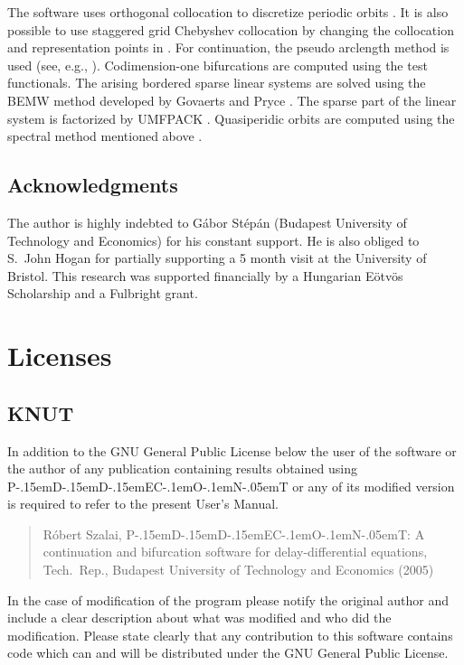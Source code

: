 \documentclass[10pt,a4paper]{ddedoc}
\def\knut{{P\kern-.15emD\kern-.15emD\kern-.15emE\raisebox{.25ex}{-}C\kern-.1emO\kern-.1emN\kern-.05emT}}
\begin{document}
The software uses orthogonal collocation to discretize periodic orbits
\cite{engstab,engcol}. It is also possible to use staggered grid Chebyshev
collocation \cite{kopriva} by changing the collocation and representation points
in . For continuation, the pseudo arclength method is
used (see, e.g., \cite{handbook, tutorial1, tutorial2}). Codimension-one
bifurcations are computed using the test functionals. The arising bordered
sparse linear systems are solved using the BEMW method developed by Govaerts and
Pryce \cite{Gov1993}. The sparse part of the linear system is factorized by
UMFPACK \cite{umfpack}. Quasiperidic orbits are computed using the spectral
method mentioned above \cite{kopriva,roose-szalai}.

\subsection*{Acknowledgments}

The author is highly indebted to G\'abor St\'ep\'an (Budapest University of 
Technology and Economics) for his constant support. He is also
obliged to S.~John Hogan for partially supporting a 5 month visit at the
University of Bristol.
This research was supported financially by a Hungarian E\"otv\"os Scholarship
and a Fulbright grant.

\appendix

\section{Licenses}

\subsection{KNUT}

In addition to the GNU General Public License below the user of the software or
the author of any
publication containing results obtained using \knut{} or any of its modified
version is required to refer to the present User's Manual.
\begin{quote}
R\'obert Szalai, \knut{}: A continuation and bifurcation software for 
delay-differential equations, Tech.\ Rep., Budapest University of Technology
and Economics (2005)
\end{quote}
In the case of modification of the program please notify the original author and
include a clear description about what was modified and who did the 
modification. Please state clearly that any contribution to this software
contains code which can and will be distributed under the GNU General Public
License.
\end{document}
